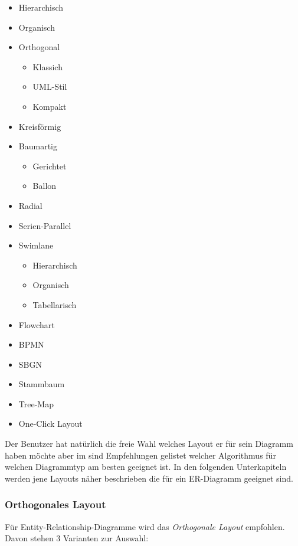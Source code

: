 \begin{multicols}{2}
	\begin{itemize}
		\item Hierarchisch
		\item Organisch
		\item Orthogonal
		\begin{itemize}
			\item Klassich
			\item UML-Stil
			\item Kompakt
		\end{itemize}
		\item Kreisförmig
		\item Baumartig
		\begin{itemize}
			\item Gerichtet
			\item Ballon
		\end{itemize}
		\item Radial
		\item Serien-Parallel
		\item Swimlane
		\begin{itemize}
			\item Hierarchisch
			\item Organisch
			\item Tabellarisch
		\end{itemize}
		\item Flowchart
		\item BPMN
		\item SBGN
		\item Stammbaum
		\item Tree-Map
		\item One-Click Layout
	\end{itemize}
\end{multicols}

\noindent
Der Benutzer hat natürlich die freie Wahl welches Layout er für sein Diagramm haben möchte aber im \cite{yEdManual} sind Empfehlungen gelistet welcher Algorithmus für welchen Diagrammtyp am besten geeignet ist. In den folgenden Unterkapiteln werden jene Layouts näher beschrieben die für ein ER-Diagramm geeignet sind.

\subsubsection{Orthogonales Layout}

Für Entity-Relationship-Diagramme wird das \textit{Orthogonale Layout} empfohlen. Davon stehen 3 Varianten zur Auswahl:
\\

